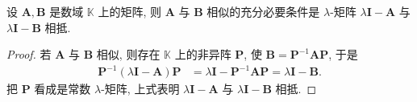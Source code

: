 \documentclass[../../main.tex]{subfiles}%
\begin{document}
\begin{theorem}\label{theorem:矩阵相似的充要条件是对应的lamda-矩阵相抵}
设 $\boldsymbol{A},\boldsymbol{B}$ 是数域 $\mathbb{K}$ 上的矩阵, 则 $\boldsymbol{A}$ 与 $\boldsymbol{B}$ 相似的充分必要条件是 $\lambda$-矩阵 $\lambda\boldsymbol{I}-\boldsymbol{A}$ 与 $\lambda\boldsymbol{I}-\boldsymbol{B}$ 相抵.
\end{theorem}
\begin{proof}

若 $\boldsymbol{A}$ 与 $\boldsymbol{B}$ 相似, 则存在 $\mathbb{K}$ 上的非异阵 $\boldsymbol{P}$, 使 $\boldsymbol{B}=\boldsymbol{P}^{-1}\boldsymbol{A}\boldsymbol{P}$, 于是
\begin{align*}
\boldsymbol{P}^{-1}(\lambda\boldsymbol{I}-\boldsymbol{A})\boldsymbol{P}&=\lambda\boldsymbol{I}-\boldsymbol{P}^{-1}\boldsymbol{A}\boldsymbol{P}=\lambda\boldsymbol{I}-\boldsymbol{B}. 
\end{align*}
把 $\boldsymbol{P}$ 看成是常数 $\lambda$-矩阵, 上式表明 $\lambda\boldsymbol{I}-\boldsymbol{A}$ 与 $\lambda\boldsymbol{I}-\boldsymbol{B}$ 相抵.


\end{proof}
\end{document}
